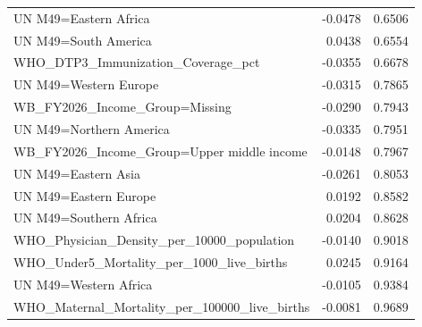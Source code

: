 \documentclass[runningheads]{llncs}
\begin{document}
{\begin{longtable}{p{}r@{\hspace{1.5em}}r}
UN M49=Eastern Africa & -0.0478 & 0.6506 \\
UN M49=South America & 0.0438 & 0.6554 \\
WHO\_DTP3\_Immunization\_Coverage\_pct & -0.0355 & 0.6678 \\
UN M49=Western Europe & -0.0315 & 0.7865 \\
WB\_FY2026\_Income\_Group=Missing & -0.0290 & 0.7943 \\
UN M49=Northern America & -0.0335 & 0.7951 \\
WB\_FY2026\_Income\_Group=Upper middle income & -0.0148 & 0.7967 \\
UN M49=Eastern Asia & -0.0261 & 0.8053 \\
UN M49=Eastern Europe & 0.0192 & 0.8582 \\
UN M49=Southern Africa & 0.0204 & 0.8628 \\
WHO\_Physician\_Density\_per\_10000\_population & -0.0140 & 0.9018 \\
WHO\_Under5\_Mortality\_per\_1000\_live\_births & 0.0245 & 0.9164 \\
UN M49=Western Africa & -0.0105 & 0.9384 \\
WHO\_Maternal\_Mortality\_per\_100000\_live\_births & -0.0081 & 0.9689 \\
\hline
\end{longtable}

}
\end{document}
